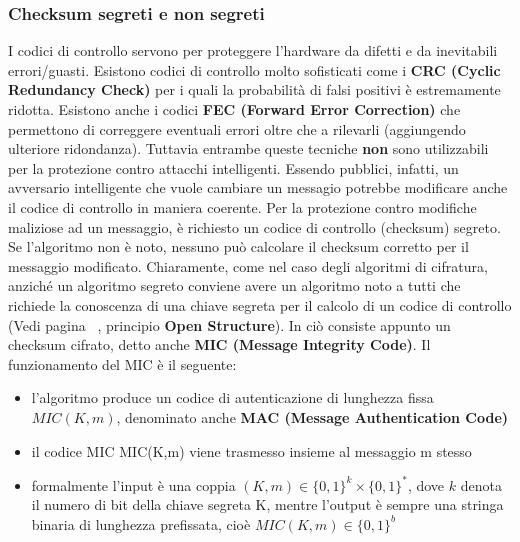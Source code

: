 \subsubsection{Checksum segreti e non segreti}
I codici di controllo servono per proteggere l’hardware da difetti e da inevitabili errori/guasti. Esistono codici di controllo molto sofisticati come i \textbf{CRC (Cyclic Redundancy Check)} per i quali la probabilità di falsi positivi è estremamente ridotta. Esistono anche i codici \textbf{FEC (Forward Error Correction)} che permettono di correggere eventuali errori oltre che a rilevarli (aggiungendo ulteriore ridondanza). Tuttavia entrambe queste tecniche \textbf{non} sono utilizzabili per la protezione contro attacchi intelligenti. Essendo pubblici, infatti, un avversario intelligente che vuole cambiare un messagio potrebbe modificare anche il codice di controllo in maniera coerente.\newline \newline
Per la protezione contro modifiche maliziose ad un messaggio, è richiesto un codice di controllo (checksum) segreto. Se l'algoritmo non è noto, nessuno può calcolare il checksum corretto per il messaggio modificato. Chiaramente, come nel caso degli algoritmi di cifratura, anziché un
algoritmo segreto conviene avere un algoritmo noto a tutti che richiede la conoscenza di una chiave segreta per il calcolo di un codice di controllo (Vedi pagina ~\pageref{sec:openStruct}, principio \textbf{Open Structure}). \newline \newline
In ciò consiste appunto un checksum cifrato, detto anche \textbf{MIC (Message Integrity Code)}. Il funzionamento del MIC è il seguente:
\begin{itemize}
  \item l'algoritmo produce un codice di autenticazione di lunghezza fissa $MIC(K,m)$, denominato anche \textbf{MAC (Message Authentication Code)}
  \item il codice MIC MIC(K,m) viene trasmesso insieme al messaggio m stesso
  \item formalmente l’input è una coppia $(K,m) \in \{0, 1\}^k \times \{0, 1\}^*$, dove $k$ denota il numero di bit della chiave segreta K, mentre l'output è sempre una stringa binaria di lunghezza prefissata, cioè $MIC(K,m) \in \{0, 1\}^b$
\end{itemize}


